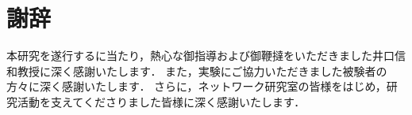 \section*{謝辞}
本研究を遂行するに当たり，熱心な御指導および御鞭撻をいただきました井口信和教授に深く感謝いたします．
また，実験にご協力いただきました被験者の方々に深く感謝いたします．
さらに，ネットワーク研究室の皆様をはじめ，研究活動を支えてくださりました皆様に深く感謝いたします．